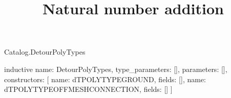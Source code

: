 \begin{lexlean}{Catalog.DetourPolyTypes}
\title{Natural number addition}
\begin{semanticmodule}
inductive{
  name: DetourPolyTypes,
  type_parameters: [],
  parameters: [],
  constructors: [
    {name: dTPOLYTYPEGROUND, fields: []},
    {name: dTPOLYTYPEOFFMESHCONNECTION, fields: []}
  ]
}
\end{semanticmodule}
\end{lexlean}
